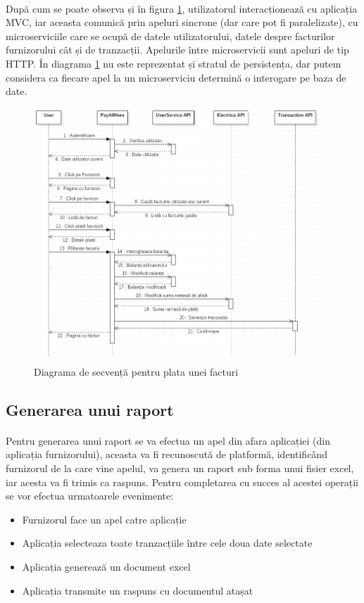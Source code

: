 \documentclass[12pt]{report}
\begin{document}
  	\paragraph{}După cum se poate observa și în figura \ref{utilizseq}, utilizatorul interacționează cu aplicația MVC, iar aceasta comunică prin apeluri sincrone (dar care pot fi paralelizate), cu microserviciile care se ocupă de datele utilizatorului, datele despre facturilor furnizorului cât și de tranzacții. Apelurile între microservicii sunt apeluri de tip HTTP. În diagrama \ref{utilizseq} nu este reprezentat și stratul de persistența, dar putem considera ca fiecare apel la un microserviciu determină o interogare pe baza de date.
  	\begin{figure}[h]
  	\centering
  	\includegraphics[scale=0.9]{utilizseq}
	\caption{Diagrama de secvență pentru plata unei facturi}  
	\label{utilizseq}
  	\end{figure}
  	\subsection{Generarea unui raport}
  	\paragraph{}Pentru generarea unui raport se va efectua un apel din afara aplicației (din aplicația furnizorului), aceasta va fi recunoscută de platformă, identificând furnizorul de la care vine apelul, va genera un raport sub forma unui fisier excel, iar acesta va fi trimis ca raspuns. Pentru completarea cu succes al acestei operații se vor efectua urmatoarele evenimente:
  	\begin{itemize}
  	\item Furnizorul face un apel catre aplicație
  	\item Aplicația selecteaza toate tranzacțiile între cele doua date selectate
  	\item Aplicația generează un document excel
  	\item Aplicația transmite un raspuns cu documentul atașat
  	\end{itemize}
\end{document}
